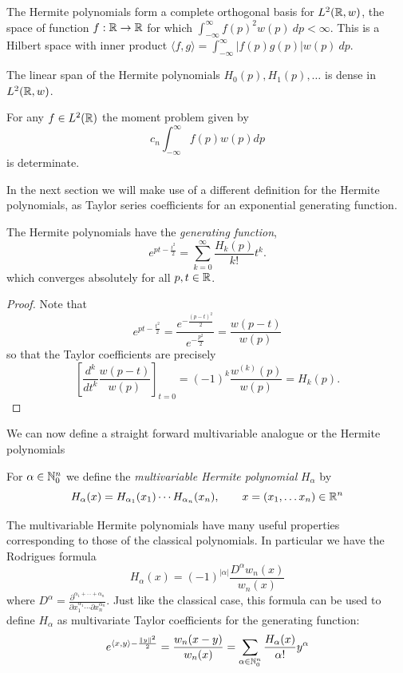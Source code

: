 
The Hermite polynomials form a complete orthogonal basis for $L^2(\mathbb{R}, w)$, the space of function $f : \mathbb{R} \to \mathbb{R}$ for which $\int_{-\infty}^\infty f(p)^2 w(p)~dp < \infty$. This is a Hilbert space with inner product $\langle f, g \rangle = \int_{-\infty}^\infty |f(p)g(p)| w(p)~dp$.
\begin{proposition}
   The linear span of the Hermite polynomials $H_0(p), H_1(p), \ldots$ is dense in $L^2(\mathbb{R}, w)$.
\end{proposition}

\begin{corollary}
  For any $f \in L^2(\mathbb{R})$ the moment problem given by
  \[
    c_n \int_{-\infty}^\infty f(p) w(p) dp
  \]
  is determinate.
\end{corollary}

In the next section we will make use of a different definition for the Hermite polynomials, as Taylor series coefficients for an exponential generating function.
\begin{proposition}
  The Hermite polynomials have the \emph{generating function},
  \[
    e^{pt - \frac{t^2}2} 
      = \sum_{k = 0}^\infty \frac{H_k(p)}{k!}t^k.
  \]
  which converges absolutely for all $p, t \in \mathbb{R}$.
\end{proposition}

\begin{proof}
Note that
\[
  e^{pt - \frac{t^2}2} 
    = \frac{e^{-\frac{(p-t)^2}2}}{e^{-\frac{p^2}2}} 
    = \frac{w(p - t)}{w(p)}
\]
so that the Taylor coefficients are precisely
\[
  \left[\frac{d^k}{dt^k}\frac{w(p - t)}{w(p)}\right]_{t = 0} 
    = (-1)^k \frac{w^{(k)}(p)}{w(p)} = H_k(p).
\]
\end{proof}

We can now define a straight forward multivariable analogue or the 
Hermite polynomials 

\begin{definition}
  For $\alpha \in \mathbb{N}_0^n$ we define the \emph{multivariable Hermite polynomial} $H_\alpha$ by
\[
  H_{\alpha}(x) = H_{\alpha_1}(x_1) \cdots H_{\alpha_n}(x_n), \qquad x = (x_1, \ldots x_n) \in \mathbb{R}^n 
\]
\end{definition}

The multivariable Hermite polynomials have many useful properties corresponding to those of the classical polynomials. In particular we have the Rodrigues formula
\[
  H_\alpha(x) 
    = (-1)^{|\alpha|}\frac{D^{\alpha}w_n(x)}{w_n(x)}
\]
where $D^\alpha = \frac{\partial^{\alpha_1 + \cdots + \alpha_n}}{\partial x_1^{\alpha_1} \cdots \partial x_n^{\alpha_n}}$. Just like the classical case, this formula can be used to define $H_\alpha$ as multivariate Taylor coefficients for the generating function:
\[
  e^{\langle x, y\rangle - \frac{\|y\|^2}2} 
    = \frac{w_n(x - y)}{w_n(x)} 
      = \sum_{\alpha \in \mathbb{N}_0^n} \frac{H_\alpha(x)}{\alpha!}y^\alpha
\]


